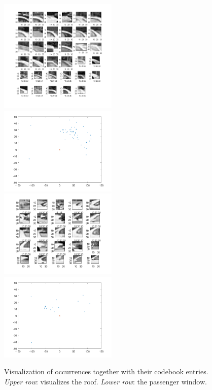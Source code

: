\documentclass[12pt]{article}
\begin{document}
\begin{figure}[H]
	\includegraphics[width=0.5\textwidth]{features3}
	\includegraphics[width=0.5\textwidth]{clusters3}
	\includegraphics[width=0.5\textwidth]{features4}
	\includegraphics[width=0.5\textwidth]{clusters4}
	
	
	\caption{Visualization of occurrences together with their codebook entries. \textit{Upper row}: visualizes the roof. \textit{Lower row}: the passenger window. }
\end{figure}
\end{document}
